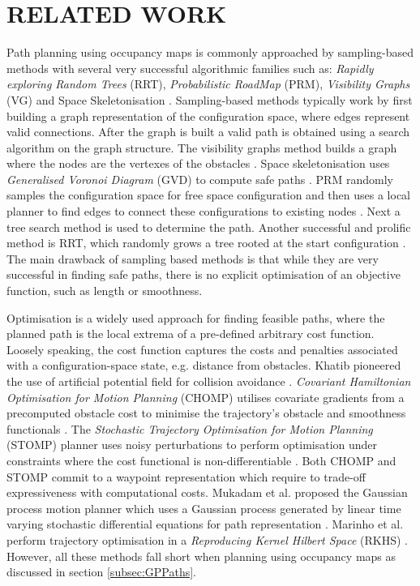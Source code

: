 \documentclass[letterpaper, 10 pt, conference]{ieeeconf}  %
\begin{document}
\section{RELATED WORK}\label{sec:RelatedWork}

Path planning using occupancy maps is commonly approached by sampling-based methods with several very successful algorithmic families such as: \textit{Rapidly exploring Random Trees} (RRT), \textit{Probabilistic RoadMap} (PRM), \textit{Visibility Graphs} (VG) and Space Skeletonisation \cite{Tsardoulias2016}. 
Sampling-based methods typically work by first building a graph representation of the configuration space, where edges represent valid connections. After the graph is built a valid path is obtained using a search algorithm on the graph structure. The visibility graphs method builds a graph where the nodes are the vertexes of the obstacles \cite{lozano1979algorithm}. Space skeletonisation uses \textit{Generalised Voronoi Diagram} (GVD) to compute safe paths \cite{bhattacharya2007voronoi, garrido2006path}. PRM randomly samples the configuration space for free space configuration and then  uses a local planner to find edges to connect these configurations to existing nodes \cite{Kavraki1996}. Next a tree search method is used to determine the path. Another successful and prolific method is RRT, which randomly grows a tree rooted at the start configuration \cite{Lavalle98rapidly-exploringrandom}. The main drawback of sampling based methods is that while they are very successful in finding safe paths, there is no explicit optimisation of an objective function, such as length or smoothness.

Optimisation is a widely used approach for finding feasible paths, where the planned path is the local extrema of a pre-defined arbitrary cost function. Loosely speaking, the cost function captures the costs and penalties associated with a configuration-space state, e.g. distance from obstacles. Khatib pioneered the use of artificial potential field for collision avoidance \cite{Khatib1986}. \textit{Covariant Hamiltonian Optimisation for Motion Planning} (CHOMP) utilises covariate gradients from a precomputed obstacle cost to minimise the trajectory's obstacle and smoothness functionals \cite{Zucker2013}. The \textit{Stochastic Trajectory Optimisation for Motion Planning} (STOMP) planner uses noisy perturbations to perform optimisation under constraints where the cost functional is non-differentiable \cite{Kalakrishnan2011}. Both CHOMP and STOMP commit to a waypoint representation which require to trade-off expressiveness with computational costs. Mukadam et al. proposed the Gaussian process motion planner which uses a Gaussian process generated by linear time varying stochastic differential equations for path representation \cite{mukadam2016gaussian}. Marinho et al. perform trajectory optimisation in a \textit{Reproducing Kernel Hilbert Space} (RKHS) \cite{Marinho2016}. However, all these methods fall short when planning using occupancy maps as discussed in section \ref{subsec:GPPaths}. 
\end{document}
